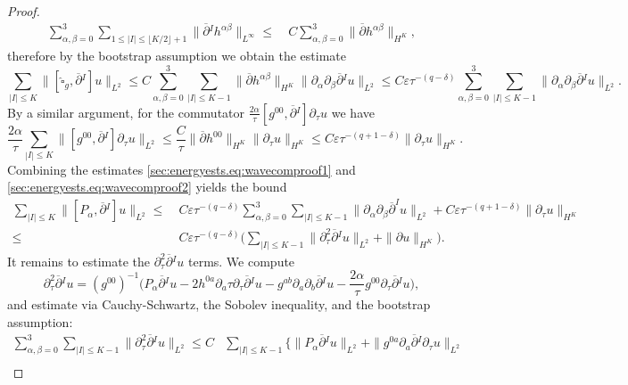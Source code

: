 \documentclass{article}
\newcommand{\ol}{\overline}
\newcommand{\wh}{\widehat}
\newcommand{\ve}{\varepsilon}
\newcommand{\pa}{\partial}
\begin{document}
\begin{proof}
\begin{subequations}
\begin{align}
            \sum_{\alpha,\beta = 0}^3\sum_{1 \leq |I| \leq \lfloor K/2\rfloor+1}\|\ol{\pa}{}^I  h^{\alpha\beta}\|_{L^\infty}  \leq&\> C\sum_{\alpha,\beta = 0}^3 \|\ol{\pa} h^{\alpha\beta}\|_{H^K},
        \end{align}
    \end{subequations}
    therefore by the bootstrap assumption we obtain the estimate
    \begin{equation}\label{sec:energyests.eq:wavecomproof1}
        \sum_{|I|\leq K}\|[\wh{\square}_g,\ol{\pa}{}^I]u\|_{L^2} \leq C\sum_{\alpha,\beta=0}^3\sum_{|I|\leq K-1}\|\ol{\pa}h^{\alpha\beta}\|_{H^K}\|\pa_\alpha\pa_\beta \ol{\pa}{}^Iu\|_{L^2} \leq C\ve\tau^{-(q-\delta)}\sum_{\alpha,\beta=0}^3\sum_{|I|\leq K-1}\|\pa_\alpha\pa_\beta \ol{\pa}{}^Iu\|_{L^2}.
    \end{equation}
    By a similar argument, for the commutator $\frac{2\alpha}{\tau}[g^{00},\ol{\pa}{}^I]\pa_\tau u$ we have
    \begin{equation}\label{sec:energyests.eq:wavecomproof2}
        \frac{2\alpha}{\tau}\sum_{|I|\leq K}\|[g^{00},\ol{\pa}{}^I]\pa_\tau u\|_{L^2} \leq \frac{C}{\tau}\|\ol{\pa}h^{00}\|_{H^K}\|\pa_\tau u\|_{H^K}\leq C\ve\tau^{-(q+1-\delta)}\|\pa_\tau u\|_{H^K}.
    \end{equation}
    Combining the estimates \eqref{sec:energyests.eq:wavecomproof1} and \eqref{sec:energyests.eq:wavecomproof2} yields the bound
    \begin{align}
        \sum_{|I|\leq K}\big\|[P_\alpha,\ol{\pa}{}^I]u\|_{L^2} \leq&\>C\ve\tau^{-(q-\delta)}\sum_{\alpha,\beta=0}^3 \sum_{|I|\leq K-1}\|\pa_\alpha\pa_\beta\ol{\pa}^I u\|_{L^2} +C\ve\tau^{-(q+1-\delta)}\|\pa_\tau u\|_{H^K}\nonumber\\
        \leq &\>C\ve\tau^{-(q-\delta)} \Big(\sum_{|I|\leq K-1}\|\pa_\tau^2 \ol{\pa}{}^I u\|_{L^2} +\|\pa u\|_{H^K}\Big).\label{sec:energyests.eq:wavecomproof3}
    \end{align}
    It remains to estimate the $\pa_\tau^2 \ol{\pa}{}^I u$ terms. We compute
    \begin{equation}
        \pa_\tau^2 \ol{\pa}{}^Iu = (g^{00})^{-1}\Big(P_\alpha \ol{\pa}{}^Iu - 2 h^{0a}\pa_a\tau \pa_\tau \ol{\pa}{}^Iu - g^{ab}\pa_a\pa_b \ol{\pa}{}^Iu - \frac{2\alpha}{\tau}g^{00}\pa_\tau \ol{\pa}{}^I u \Big),
    \end{equation}
    and estimate via Cauchy-Schwartz, the Sobolev inequality, and the bootstrap assumption:
    \begin{align}
        \sum_{\alpha,\beta =0}^3 \sum_{|I|\leq K-1}\|\pa_\tau^2 \ol{\pa}{}^I u\|_{L^2} \leq C&\sum_{|I|\leq K-1}\Big\{\|P_\alpha \ol{\pa}{}^I u\|_{L^2} + \|g^{0a}\pa_a \ol{\pa}{}^I \pa_\tau u\|_{L^2}\nonumber\\

\end{align}
\end{proof}
\end{document}
